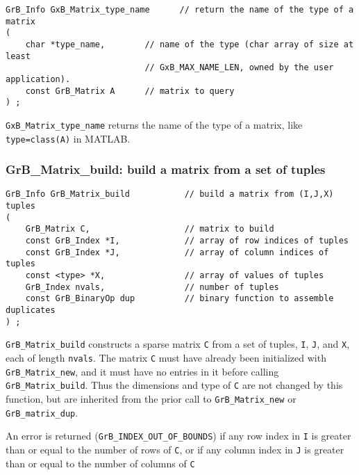\documentclass[12pt]{article}
\begin{document}
\begin{mdframed}[userdefinedwidth=6in]
{\footnotesize
\begin{verbatim}
GrB_Info GxB_Matrix_type_name      // return the name of the type of a matrix
(
    char *type_name,        // name of the type (char array of size at least
                            // GxB_MAX_NAME_LEN, owned by the user application).
    const GrB_Matrix A      // matrix to query
) ;
\end{verbatim} } \end{mdframed}

\verb'GxB_Matrix_type_name' returns the name of the type of a matrix, like
\verb'type=class(A)' in MATLAB.

\subsubsection{{\sf GrB\_Matrix\_build:} build a matrix from a set of tuples}
\label{matrix_build}

\begin{mdframed}[userdefinedwidth=6in]
{\footnotesize
\begin{verbatim}
GrB_Info GrB_Matrix_build           // build a matrix from (I,J,X) tuples
(
    GrB_Matrix C,                   // matrix to build
    const GrB_Index *I,             // array of row indices of tuples
    const GrB_Index *J,             // array of column indices of tuples
    const <type> *X,                // array of values of tuples
    GrB_Index nvals,                // number of tuples
    const GrB_BinaryOp dup          // binary function to assemble duplicates
) ;
\end{verbatim} } \end{mdframed}

\verb'GrB_Matrix_build' constructs a sparse matrix \verb'C' from a set of
tuples, \verb'I', \verb'J', and \verb'X', each of length \verb'nvals'.  The
matrix \verb'C' must have already been initialized with \verb'GrB_Matrix_new',
and it must have no entries in it before calling \verb'GrB_Matrix_build'.  Thus
the dimensions and type of \verb'C' are not changed by this function, but are
inherited from the prior call to \verb'GrB_Matrix_new' or
\verb'GrB_matrix_dup'.

An error is returned (\verb'GrB_INDEX_OUT_OF_BOUNDS') if any row index in
\verb'I' is greater than or equal to the number of rows of \verb'C', or if any
column index in \verb'J' is greater than or equal to the number of columns of
\verb'C'
\end{document}
